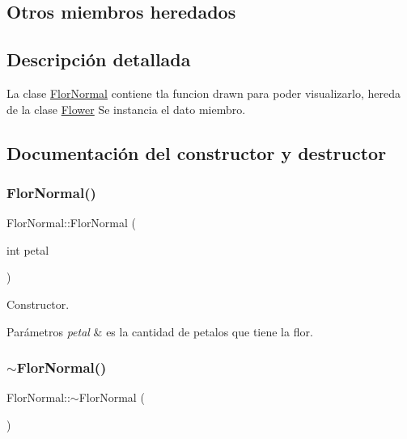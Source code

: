 \subsection*{Otros miembros heredados}


\subsection{Descripción detallada}
La clase \hyperlink{classFlorNormal}{Flor\+Normal} contiene tla funcion drawn para poder visualizarlo, hereda de la clase \hyperlink{classFlower}{Flower}  Se instancia el dato miembro. 

\subsection{Documentación del constructor y destructor}
\mbox{\label{classFlorNormal_a625a13a2e2d334eceb295ef994637d25}} 
\subsubsection{\texorpdfstring{Flor\+Normal()}{FlorNormal()}}
{\footnotesize\ttfamily Flor\+Normal\+::\+Flor\+Normal (\begin{DoxyParamCaption}\item[{int}]{petal }\end{DoxyParamCaption})}

Constructor. 
\begin{DoxyParams}{Parámetros}
{\em petal} & es la cantidad de petalos que tiene la flor. \\
\hline
\end{DoxyParams}
\mbox{\label{classFlorNormal_a96ed2aba6c2f54bd4312330ad1d56d42}} 
\subsubsection{\texorpdfstring{$\sim$\+Flor\+Normal()}{~FlorNormal()}}
{\footnotesize\ttfamily Flor\+Normal\+::$\sim$\+Flor\+Normal (\begin{DoxyParamCaption}{ }\end{DoxyParamCaption})}

